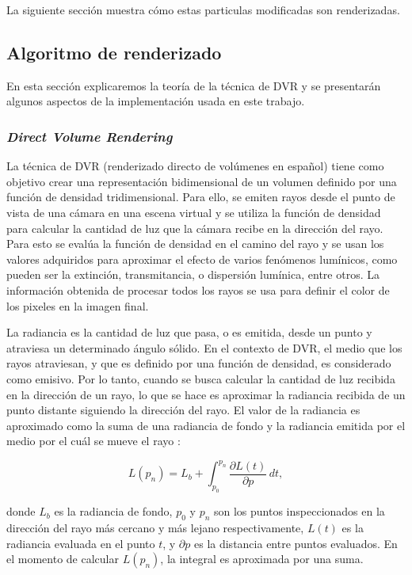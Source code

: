 \documentclass[oneside,a4paper,spanish,links]{amca}
\begin{document}
La siguiente secci\'on muestra c\'omo estas particulas modificadas son renderizadas.

\subsection{Algoritmo de renderizado}

En esta sección explicaremos la teoría de la técnica de DVR y se
presentarán algunos aspectos de la implementación usada en este
trabajo.

\subsubsection{\emph{Direct Volume Rendering}}

La técnica de DVR (renderizado directo de volúmenes en español) tiene
como objetivo crear una representación bidimensional de un vo\-lu\-men
definido por una función de densidad tridimensional. Para ello, se
emiten rayos desde el punto de vista de una cámara en una escena
virtual y se utiliza la función de densidad para calcular la cantidad
de luz que la cámara recibe en la dirección del rayo. Para esto se
evalúa la función de densidad en el camino del rayo y se usan los
valores adquiridos para aproximar el efecto de varios fenómenos
lumínicos, como pueden ser la extinción, transmitancia, o dispersión
lumínica, entre otros. La información obtenida de procesar todos los
rayos se usa para definir el color de los pixeles en la imagen final.

La radiancia es la cantidad de luz que pasa, o es emitida, desde un
punto y atraviesa un determinado ángulo sólido. En el contexto de DVR,
el medio que los rayos atraviesan, y que es definido por una función
de densidad, es considerado como emisivo. Por lo tanto, cuando se
busca calcular la cantidad de luz recibida en la dirección de un rayo,
lo que se hace es aproximar la radiancia recibida de un punto distante
siguiendo la dirección del rayo. El valor de la radiancia es
aproximado como la suma de una radiancia de fondo y la radiancia
emitida por el medio por el cuál se mueve el rayo \citep{Kratz2006} :

\begin{equation} \label{eq:general_radiance}  
  L(p_n) = L_b + \int_{p_0}^{p_n} \frac{\partial L(t)}{\partial p} \, dt,
\end{equation}

\noindent donde $L_b$ es la radiancia de fondo, $p_0$ y $p_n$ son los
puntos inspeccionados en la dirección del rayo más cercano y más
lejano respectivamente, $L(t)$ es la radiancia evaluada en el punto
$t$, y $\partial p$ es la distancia entre puntos evaluados. En el
momento de calcular $L(p_n)$, la integral es aproximada por una suma.
\end{document}
